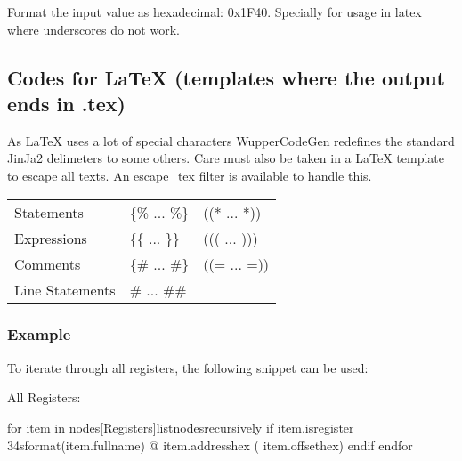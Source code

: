 \documentclass[letterpaper,10pt,english]{sphinxmanual}
\begin{document}
\begin{fulllineitems}
\label{\detokenize{developer:wuppercodegen.filter.xhex}}
Format the input value as hexadecimal: 0x1F40. Specially for usage in latex where underscores do not work.

\end{fulllineitems}



\subsection{Codes for LaTeX (templates where the output ends in .tex)}
\label{\detokenize{developer:codes-for-latex-templates-where-the-output-ends-in-tex}}
As LaTeX uses a lot of special characters WupperCodeGen redefines
the standard JinJa2 delimeters to some others. Care must also be
taken in a LaTeX template to escape all texts. An escape\_tex filter
is available to handle this.

\noindent\begin{tabulary}{\linewidth}{|L|L|L|}
\hline
{}\relax &\relax &\relax \\
\hline
Statements
&
\{\% ... \%\}
&
((* ... *))
\\
\hline
Expressions
&
\{\{ ... \}\}
&
((( ... )))
\\
\hline
Comments
&
\{\# ... \#\}
&
((= ... =))
\\
\hline
Line Statements
&
\#  ... \#\#
&\\
\hline\end{tabulary}



\subsubsection{Example}
\label{\detokenize{developer:example}}
To iterate through all registers, the following snippet can be used:

\begin{sphinxVerbatim}[commandchars=\\\{\}]
All Registers:

\PYGZob{}\PYGZpc{} for item in nodes[\PYGZsq{}Registers\PYGZsq{}]\textbar{}list\PYGZus{}nodes\PYGZus{}recursively \PYGZpc{}\PYGZcb{}
\PYGZob{}\PYGZpc{} if item.is\PYGZus{}register \PYGZpc{}\PYGZcb{}
    \PYGZob{}\PYGZob{} \PYGZdq{}\PYGZpc{}\PYGZhy{}34s\PYGZdq{}\textbar{}format(item.full\PYGZus{}name) \PYGZcb{}\PYGZcb{} @ \PYGZob{}\PYGZob{} item.address\textbar{}hex\PYGZcb{}\PYGZcb{} (\PYGZob{}\PYGZob{} item.offset\textbar{}hex\PYGZcb{}\PYGZcb{})
\PYGZob{}\PYGZpc{} endif \PYGZpc{}\PYGZcb{}
\PYGZob{}\PYGZpc{} endfor \PYGZpc{}\PYGZcb{}
\end{sphinxVerbatim}
\end{document}
